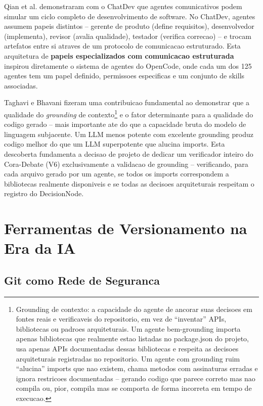 \documentclass[12pt,a4paper,oneside,sumario=tradicional,chapter=TITLE,section=TITLE,subsection=TITLE,english,brazil]{abntex2}
\begin{document}
Qian et al. \cite{qian2024chatdev} demonstraram com o ChatDev que agentes comunicativos podem simular um ciclo completo de desenvolvimento de software. No ChatDev, agentes assumem papeis distintos -- gerente de produto (define requisitos), desenvolvedor (implementa), revisor (avalia qualidade), testador (verifica correcao) -- e trocam artefatos entre si atraves de um protocolo de comunicacao estruturado. Esta arquitetura de \textbf{papeis especializados com comunicacao estruturada} inspirou diretamente o sistema de agentes do OpenCode, onde cada um dos 125 agentes tem um papel definido, permissoes especificas e um conjunto de skills associadas.

Taghavi e Bhavani \cite{taghavi2026spec} fizeram uma contribuicao fundamental ao demonstrar que a qualidade do \textit{grounding} de contexto\footnote{Grounding de contexto: a capacidade do agente de ancorar suas decisoes em fontes reais e verificaveis do repositorio, em vez de ``inventar'' APIs, bibliotecas ou padroes arquiteturais. Um agente bem-grounding importa apenas bibliotecas que realmente estao listadas no package.json do projeto, usa apenas APIs documentadas dessas bibliotecas e respeita as decisoes arquiteturais registradas no repositorio. Um agente com grounding ruim ``alucina'' imports que nao existem, chama metodos com assinaturas erradas e ignora restricoes documentadas -- gerando codigo que parece correto mas nao compila ou, pior, compila mas se comporta de forma incorreta em tempo de execucao.} e o fator determinante para a qualidade do codigo gerado -- mais importante ate do que a capacidade bruta do modelo de linguagem subjacente. Um LLM menos potente com excelente grounding produz codigo melhor do que um LLM superpotente que alucina imports. Esta descoberta fundamenta a decisao de projeto de dedicar um verificador inteiro do Cora-Debate (V6) exclusivamente a validacao de grounding -- verificando, para cada arquivo gerado por um agente, se todos os imports correspondem a bibliotecas realmente disponiveis e se todas as decisoes arquiteturais respeitam o registro do DecisionNode.

\section{Ferramentas de Versionamento na Era da IA}

\subsection{Git como Rede de Seguranca}
\end{document}

